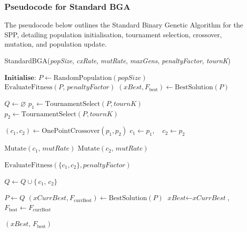 \documentclass[12pt]{article}
\begin{document}
\subsubsection{Pseudocode for Standard BGA}
The pseudocode below outlines the Standard Binary Genetic Algorithm for the SPP, detailing population initialisation, tournament selection, crossover, mutation, and population update.

\vspace{1em}
\begin{algorithm}[htbp]
  \caption{StandardBGA(\textit{popSize}, \textit{cxRate}, \textit{mutRate}, \textit{maxGens}, \textit{penaltyFactor}, \textit{tournK})}
  \label{alg:standard_bga}
  \begin{algorithmic}[1]
    \State \(\textbf{Initialise:}\)
    \State $P \gets \text{RandomPopulation}(\textit{popSize})$ 
    \State $\text{EvaluateFitness}(P,\, \textit{penaltyFactor})$ 
    \State $(\textit{xBest}, F_{\text{best}}) \gets \text{BestSolution}(P)$ 

      \State $Q \gets \varnothing$ 
        \State $p_1 \gets \text{TournamentSelect}(P, \textit{tournK})$ 
        \State $p_2 \gets \text{TournamentSelect}(P, \textit{tournK})$ 
        
          \State $(c_1, c_2) \gets \text{OnePointCrossover}(p_1, p_2)$
        \Else
          \State $c_1 \gets p_1,\quad c_2 \gets p_2$ 
        \EndIf

        \State $\text{Mutate}(c_1,\, \textit{mutRate})$
        \State $\text{Mutate}(c_2,\, \textit{mutRate})$

        \State $\text{EvaluateFitness}(\{c_1, c_2\}, \textit{penaltyFactor})$
        
        \State $Q \gets Q \cup \{\,c_1,\,c_2\}$
      \EndWhile

      \State $P \gets Q$ 
      \State $(\textit{xCurrBest}, F_{\text{currBest}}) \gets \text{BestSolution}(P)$
        \State $\textit{xBest} \gets \textit{xCurrBest}$,\quad $F_{\text{best}} \gets F_{\text{currBest}}$
      \EndIf
    \EndFor
    
    \State \Return $(\textit{xBest},\, F_{\text{best}})$ 
  \end{algorithmic}
\end{algorithm}
\end{document}

